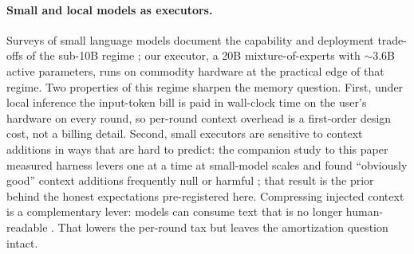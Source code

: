 \documentclass[smallcondensed,natbib]{svjour3}
\begin{document}
\paragraph{Small and local models as executors.} Surveys of small
language models document the capability and deployment trade-offs of
the sub-10B regime \citep{lu2024smalllm,corradini2025}; our executor,
a 20B mixture-of-experts with $\sim$3.6B active parameters, runs on
commodity hardware at the practical edge of that regime. Two
properties of this regime sharpen the memory question. First, under local
inference the input-token bill is paid in wall-clock time on the
user's hardware on every round, so per-round context overhead is a
first-order design cost, not a billing detail. Second, small executors
are sensitive to context additions in ways that are hard to predict:
the companion study to this paper measured harness levers one at a
time at small-model scales and found ``obviously good'' context
additions frequently null or harmful \citep{parra2026scaffolding}; that result
is the prior behind the honest expectations pre-registered here.
Compressing injected context is a complementary lever: models can
consume text that is no longer human-readable \citep{zhu2026babeltele}.
That lowers the per-round tax but leaves the amortization question
intact.
\end{document}
